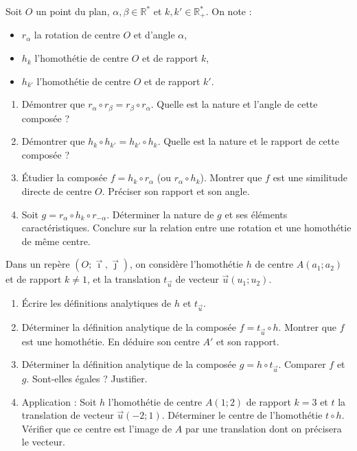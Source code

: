 \documentclass[11pt]{article}
\begin{document}
\begin{exercice}
Soit $O$ un point du plan, $\alpha, \beta \in \mathbb{R}^*$ et $k, k' \in \mathbb{R}^*_+$. On note :
\begin{itemize}
    \item $r_\alpha$ la rotation de centre $O$ et d'angle $\alpha$,
    \item $h_k$ l'homothétie de centre $O$ et de rapport $k$,
    \item $h_{k'}$ l'homothétie de centre $O$ et de rapport $k'$.
\end{itemize}
\begin{enumerate}
    \item Démontrer que $r_\alpha \circ r_\beta = r_\beta \circ r_\alpha$. Quelle est la nature et l'angle de cette composée ?
    \item Démontrer que $h_k \circ h_{k'} = h_{k'} \circ h_k$. Quelle est la nature et le rapport de cette composée ?
    \item Étudier la composée $f = h_k \circ r_\alpha$ (ou $r_\alpha \circ h_k$). Montrer que $f$ est une similitude directe de centre $O$. Préciser son rapport et son angle.
    \item Soit $g = r_\alpha \circ h_k \circ r_{-\alpha}$. Déterminer la nature de $g$ et ses éléments caractéristiques. Conclure sur la relation entre une rotation et une homothétie de même centre.
\end{enumerate}
\end{exercice}

\begin{exercice}
Dans un repère $(O;\vec{\imath},\vec{\jmath})$, on considère l'homothétie $h$ de centre $A(a_1;a_2)$ et de rapport $k \neq 1$, et la translation $t_{\vec{u}}$ de vecteur $\vec{u}(u_1;u_2)$.
\begin{enumerate}
    \item Écrire les définitions analytiques de $h$ et $t_{\vec{u}}$.
    \item Déterminer la définition analytique de la composée $f = t_{\vec{u}} \circ h$. Montrer que $f$ est une homothétie. En déduire son centre $A'$ et son rapport.
    \item Déterminer la définition analytique de la composée $g = h \circ t_{\vec{u}}$. Comparer $f$ et $g$. Sont-elles égales ? Justifier.
    \item Application : Soit $h$ l'homothétie de centre $A(1;2)$ de rapport $k=3$ et $t$ la translation de vecteur $\vec{u}(-2;1)$. Déterminer le centre de l'homothétie $t \circ h$. Vérifier que ce centre est l'image de $A$ par une translation dont on précisera le vecteur.
\end{enumerate}
\end{exercice}
\end{document}
